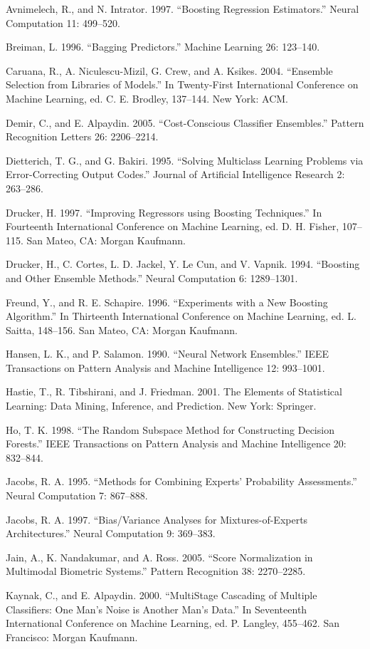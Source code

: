 Avnimelech, R., and N. Intrator. 1997. “Boosting Regression Estimators.” Neural Computation 11: 499--520.

Breiman, L. 1996. “Bagging Predictors.” Machine Learning 26: 123--140.

Caruana, R., A. Niculescu-Mizil, G. Crew, and A. Ksikes. 2004. “Ensemble Selection from Libraries of Models.” In Twenty-First International Conference on Machine Learning, ed. C. E. Brodley, 137--144. New York: ACM.

Demir, C., and E. Alpaydin. 2005. “Cost-Conscious Classifier Ensembles.” Pattern Recognition Letters 26: 2206--2214.

Dietterich, T. G., and G. Bakiri. 1995. “Solving Multiclass Learning Problems via Error-Correcting Output Codes.” Journal of Artificial Intelligence Research 2: 263--286.

Drucker, H. 1997. “Improving Regressors using Boosting Techniques.” In Fourteenth International Conference on Machine Learning, ed. D. H. Fisher, 107-- 115. San Mateo, CA: Morgan Kaufmann.

Drucker, H., C. Cortes, L. D. Jackel, Y. Le Cun, and V. Vapnik. 1994. “Boosting and Other Ensemble Methods.” Neural Computation 6: 1289--1301.

Freund, Y., and R. E. Schapire. 1996. “Experiments with a New Boosting Algorithm.” In Thirteenth International Conference on Machine Learning, ed. L. Saitta, 148--156. San Mateo, CA: Morgan Kaufmann.

Hansen, L. K., and P. Salamon. 1990. “Neural Network Ensembles.” IEEE Transactions on Pattern Analysis and Machine Intelligence 12: 993--1001.

Hastie, T., R. Tibshirani, and J. Friedman. 2001. The Elements of Statistical Learning: Data Mining, Inference, and Prediction. New York: Springer.

Ho, T. K. 1998. “The Random Subspace Method for Constructing Decision Forests.” IEEE Transactions on Pattern Analysis and Machine Intelligence 20: 832--844.

Jacobs, R. A. 1995. “Methods for Combining Experts’ Probability Assessments.” Neural Computation 7: 867--888.

Jacobs, R. A. 1997. “Bias/Variance Analyses for Mixtures-of-Experts Architectures.” Neural Computation 9: 369--383.

Jain, A., K. Nandakumar, and A. Ross. 2005. “Score Normalization in Multimodal Biometric Systems.” Pattern Recognition 38: 2270--2285.

Kaynak, C., and E. Alpaydin. 2000. “MultiStage Cascading of Multiple Classifiers: One Man’s Noise is Another Man’s Data.” In Seventeenth International Conference on Machine Learning, ed. P. Langley, 455--462. San Francisco: Morgan Kaufmann.

